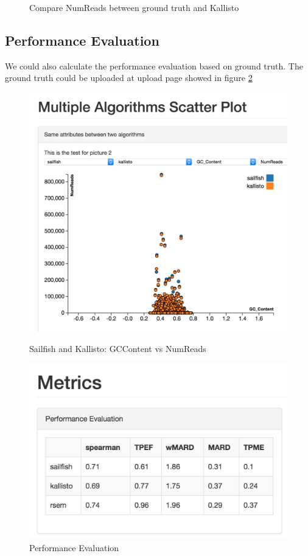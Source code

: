 \documentclass[11pt,letter]{article}
\begin{document}
\begin{figure}[ht]
\begin{minipage}[b]{0.47\linewidth}
\caption{Compare NumReads between ground truth and Kallisto  }
\label{fig:compare_truth}
\end{minipage}
\end{figure}

\subsection {Performance Evaluation}
We could also calculate the performance evaluation based on ground truth. The ground truth could be uploaded at upload page showed in figure \ref{fig:metrics}

\begin{figure}[ht]
\centering
\begin{minipage}[b]{0.47\linewidth}
\includegraphics[width=1.0\textwidth]{./fig/two_algo.jpg}
\caption{Sailfish and Kallisto:  GCContent vs  NumReads }
\label{fig:two_algo}
\end{minipage}
\quad
\begin{minipage}[b]{0.47\linewidth}
\includegraphics[width=1.0\textwidth]{./fig/metrics.jpg}
  \caption{Performance Evaluation  }
  \label{fig:metrics}
\end{minipage}
\end{figure}
\end{document}
